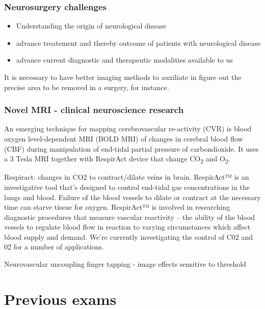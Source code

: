 \documentclass[12pt,article,oneside,a4paper]{memoir}
\begin{document}
\subsubsection{Neurosurgery challenges} 

\begin{itemize}
\item Understanding the origin of neurological disease
\item advance treatement and thereby outcome of patients with neurological disease
\item advance current diagnostic and therapeutic modalities available to us
\end{itemize}

It is necessary to have better imaging methods to auxiliate in figure out the
precise area to be removed in a surgery, for instance.

\subsubsection{Novel MRI - clinical neuroscience research}
An emerging technique for mapping cerebrovascular re-activity (CVR) is blood
oxygen level-dependent MRI (BOLD MRI) of changes in cerebral blood flow (CBF)
during manipulation of end-tidal partial pressure of carbondioxide. It uses a
3 Tesla MRI together with RespirAct device that change CO\textsubscript{2} and
O\textsubscript{2}.

Respiract: changes in CO2 to contract/dilate veins in brain. RespirAct™ is an
investigative tool that’s designed to control end-tidal gas concentrations in
the lungs and blood. Failure of the blood vessels to dilate or contract at the
necessary time can starve tissue for oxygen. RespirAct™ is involved in researching
diagnostic procedures that measure vascular reactivity – the ability of the blood
vessels to regulate blood flow in reaction to varying circumstances which affect
blood supply and demand. We’re currently investigating the control of C02 and 02
for a number of applications. 

Neurovascular uncoupling
finger tapping - image effects
sensitive to threshold

\newpage
\section{Previous exams}
\end{document}
